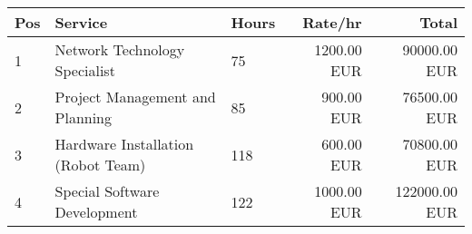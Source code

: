 
                \begin{tabularx}{\textwidth}{|l|X|l|r|r|}
                \hline
                \rowcolor{gray!30}
                \textbf{Pos} & \textbf{Service} & \textbf{Hours} & \textbf{Rate/hr} & \textbf{Total} \\
                \hline 
            

                    1 & Network Technology Specialist & 75 & 1200.00 EUR & 90000.00 EUR \\
                    \hline 
                    
                    2 & Project Management and Planning & 85 & 900.00 EUR & 76500.00 EUR \\
                    \hline 
                    
                    3 & Hardware Installation (Robot Team) & 118 & 600.00 EUR & 70800.00 EUR \\
                    \hline 
                    
                    4 & Special Software Development & 122 & 1000.00 EUR & 122000.00 EUR \\
                    \hline 
                    

                \end{tabularx} 
            